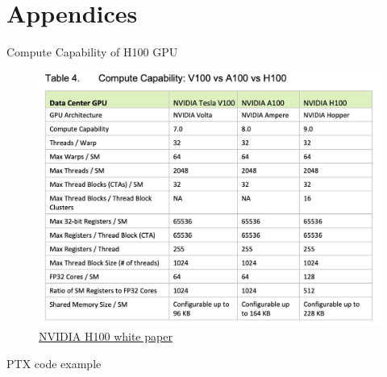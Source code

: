\documentclass[dvipdfmx, 11pt, aspectratio=169]{beamer}   %
\begin{document}
\section{Appendices}
\begin{frame}{Compute Capability of H100 GPU}
  \begin{figure}
    \includegraphics[scale=0.3]{img/computeCapability.png}
    \caption{\href{https://www.advancedclustering.com/wp-content/uploads/2022/03/gtc22-whitepaper-hopper.pdf}{NVIDIA H100 white paper}}
  \end{figure}
\end{frame}
\begin{frame}{PTX code example}
  
\end{frame}
\end{document}
